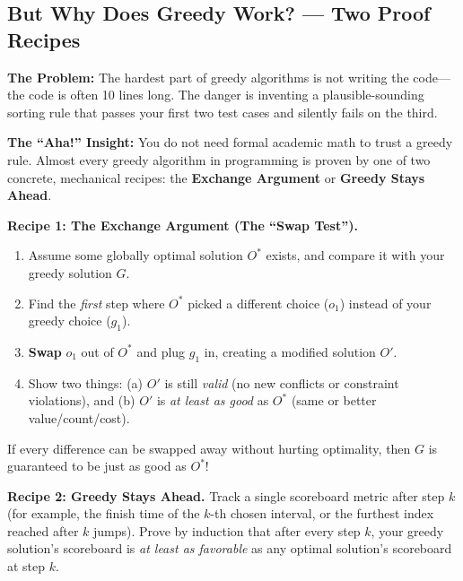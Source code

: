 \documentclass[11pt,a4paper]{article}
\theoremstyle{definition}
\newcommand{\painbeat}{\textbf{\color{accentamber}The Problem:} }
\newcommand{\ahabeat}{\textbf{\color{accentteal}The ``Aha!'' Insight:} }
\begin{document}
\subsection{But Why Does Greedy Work? --- Two Proof Recipes}

\painbeat The hardest part of greedy algorithms is not writing the code---the code is often 10 lines long. The danger is inventing a plausible-sounding sorting rule that passes your first two test cases and silently fails on the third.

\ahabeat You do not need formal academic math to trust a greedy rule. Almost every greedy algorithm in programming is proven by one of two concrete, mechanical recipes: the \textbf{Exchange Argument} or \textbf{Greedy Stays Ahead}.

\textbf{Recipe 1: The Exchange Argument (The ``Swap Test'').}
\begin{enumerate}
    \item Assume some globally optimal solution $O^*$ exists, and compare it with your greedy solution $G$.
    \item Find the \emph{first} step where $O^*$ picked a different choice ($o_1$) instead of your greedy choice ($g_1$).
    \item \textbf{Swap} $o_1$ out of $O^*$ and plug $g_1$ in, creating a modified solution $O'$.
    \item Show two things: (a) $O'$ is still \emph{valid} (no new conflicts or constraint violations), and (b) $O'$ is \emph{at least as good} as $O^*$ (same or better value/count/cost).
\end{enumerate}

If every difference can be swapped away without hurting optimality, then $G$ is guaranteed to be just as good as $O^*$!

\textbf{Recipe 2: Greedy Stays Ahead.}
Track a single scoreboard metric after step $k$ (for example, the finish time of the $k$-th chosen interval, or the furthest index reached after $k$ jumps). Prove by induction that after every step $k$, your greedy solution's scoreboard is \emph{at least as favorable} as any optimal solution's scoreboard at step $k$.
\end{document}
